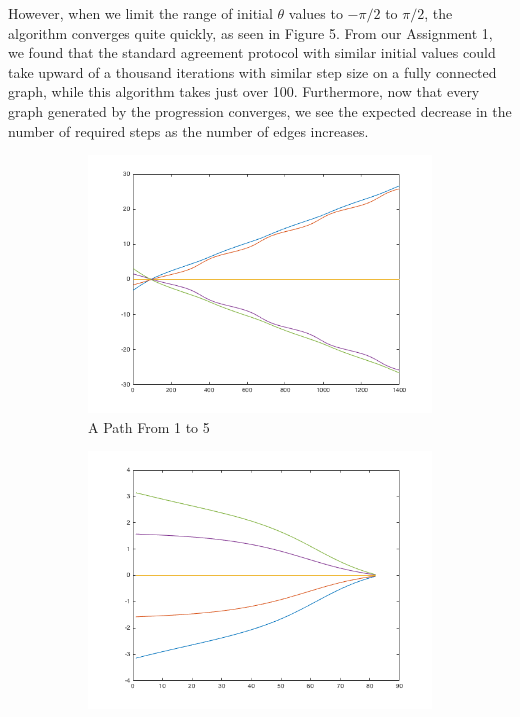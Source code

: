 \documentclass{article}
\begin{document}
However, when we limit the range of initial $\theta$ values to $-\pi/2$ to
$\pi/2$, the algorithm converges quite quickly, as seen in Figure 5. From our
Assignment 1, we found that the standard agreement protocol with similar initial
values could take upward of a thousand iterations with similar step size on a
fully connected graph, while this algorithm takes just over 100. Furthermore,
now that every graph generated by the progression converges, we see the expected
decrease in the number of required steps as the number of edges increases. 
\begin{figure}[h!]
\caption{Initial Values Between ($-\pi$ to $\pi$)\\Omega between
$(\pi\cdot 0.9,-\pi\cdot 0.9)$}
\centering
\begin{subfigure}[t]{0.3\textwidth}
\centering
\includegraphics[width=\textwidth]{./pi-min-om0-9.png}
\caption{A Path From 1 to 5}
\end{subfigure}
\begin{subfigure}[t]{0.3\textwidth}
\centering
\includegraphics[width=\textwidth]{pi-om0-9-max.png}

\end{subfigure}
\end{figure}
\end{document}
